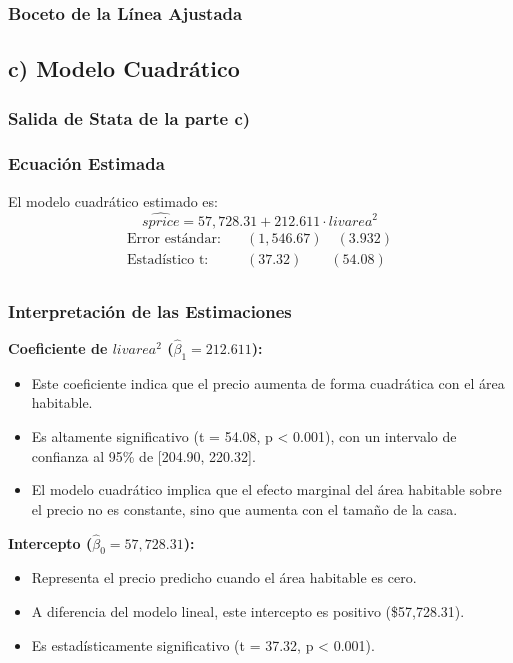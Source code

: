 \documentclass[12pt]{article}
\begin{document}
\subsubsection*{Boceto de la Línea Ajustada}

\subsection*{c) Modelo Cuadrático}

\subsubsection*{Salida de Stata de la parte c)}

\subsubsection*{Ecuación Estimada}
El modelo cuadrático estimado es:
\[
\widehat{sprice} = 57,728.31 + 212.611 \cdot livarea^2
\]
\begin{align}
\text{Error estándar:} \quad & (1,546.67) \quad (3.932) \\
\text{Estadístico t:} \quad & (37.32) \quad\quad (54.08) \\
\end{align}

\subsubsection*{Interpretación de las Estimaciones}

\textbf{Coeficiente de $livarea^2$ ($\hat{\beta}_1 = 212.611$):}
\begin{itemize}
    \item Este coeficiente indica que el precio aumenta de forma cuadrática con el área habitable.
    \item Es altamente significativo (t = 54.08, p < 0.001), con un intervalo de confianza al 95\% de [204.90, 220.32].
    \item El modelo cuadrático implica que el efecto marginal del área habitable sobre el precio no es constante, sino que aumenta con el tamaño de la casa.
\end{itemize}

\textbf{Intercepto ($\hat{\beta}_0 = 57,728.31$):}
\begin{itemize}
    \item Representa el precio predicho cuando el área habitable es cero.
    \item A diferencia del modelo lineal, este intercepto es positivo (\$57,728.31).
    \item Es estadísticamente significativo (t = 37.32, p < 0.001).
\end{itemize}
\end{document}
